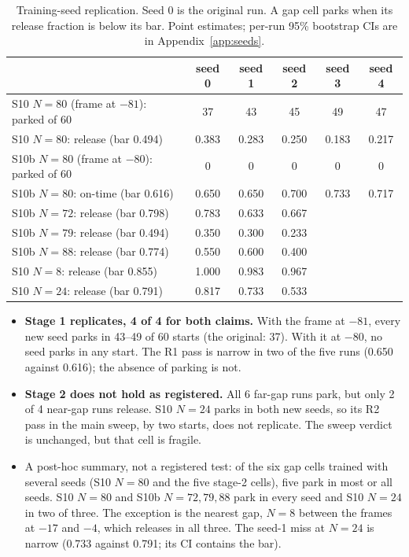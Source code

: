 \documentclass[11pt]{article}
\begin{document}
\begin{table}[h]
\centering\small
\begin{tabular}{lccccc}
\toprule
 & seed 0 & seed 1 & seed 2 & seed 3 & seed 4 \\
\midrule
S10 $N{=}80$ (frame at $-81$): parked of 60 & 37 & 43 & 45 & 49 & 47 \\
S10 $N{=}80$: release (bar 0.494) & 0.383 & 0.283 & 0.250 & 0.183 & 0.217 \\
S10b $N{=}80$ (frame at $-80$): parked of 60 & 0 & 0 & 0 & 0 & 0 \\
S10b $N{=}80$: on-time (bar 0.616) & 0.650 & 0.650 & 0.700 & 0.733 & 0.717 \\
\midrule
S10b $N{=}72$: release (bar 0.798) & 0.783 & 0.633 & 0.667 & & \\
S10b $N{=}79$: release (bar 0.494) & 0.350 & 0.300 & 0.233 & & \\
S10b $N{=}88$: release (bar 0.774) & 0.550 & 0.600 & 0.400 & & \\
S10 $N{=}8$: release (bar 0.855) & 1.000 & 0.983 & 0.967 & & \\
S10 $N{=}24$: release (bar 0.791) & 0.817 & 0.733 & 0.533 & & \\
\bottomrule
\end{tabular}
\caption{Training-seed replication. Seed 0 is the original run. A gap cell parks when its release fraction is below
its bar. Point estimates; per-run 95\% bootstrap CIs are in Appendix~\ref{app:seeds}.}
\label{tab:seeds}
\end{table}

\begin{itemize}
\item \textbf{Stage 1 replicates, 4 of 4 for both claims.} With the frame at $-81$, every new seed parks in 43--49
of 60 starts (the original: 37). With it at $-80$, no seed parks in any start. The R1 pass is narrow in two of the
five runs (0.650 against 0.616); the absence of parking is not.
\item \textbf{Stage 2 does not hold as registered.} All 6 far-gap runs park, but only 2 of 4 near-gap runs release.
S10 $N{=}24$ parks in both new seeds, so its R2 pass in the main sweep, by two starts, does not replicate. The sweep
verdict is unchanged, but that cell is fragile.
\item A post-hoc summary, not a registered test: of the six gap cells trained with several seeds (S10 $N{=}80$ and
the five stage-2 cells), five park in most or all seeds. S10 $N{=}80$ and S10b $N{=}72, 79, 88$ park in every seed
and S10 $N{=}24$ in two of three. The exception is the nearest gap, $N{=}8$ between the frames at $-17$ and $-4$,
which releases in all three. The seed-1 miss at $N{=}24$ is narrow (0.733 against 0.791; its CI contains the bar).
\end{itemize}
\end{document}
